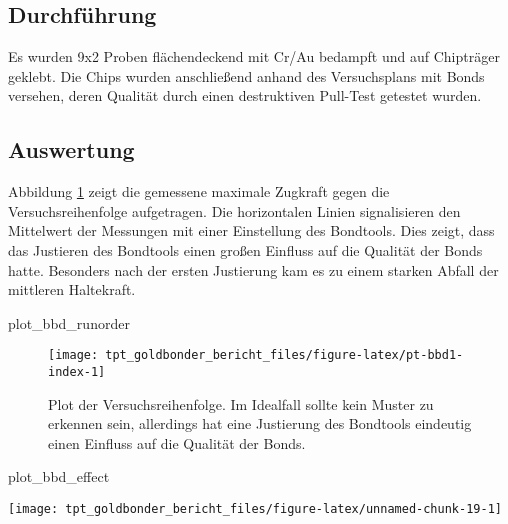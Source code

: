 \documentclass[
  paper=a4,
  ,captions=tableheading
]{scrartcl}
\newenvironment{Shaded}{\begin{snugshade}}{\end{snugshade}}
\newcommand{\NormalTok}[1]{#1}
\begin{document}
\hypertarget{pt-bbd-methods}{%
\subsection{Durchführung}\label{pt-bbd-methods}}

Es wurden 9x2 Proben flächendeckend mit Cr/Au bedampft und auf Chipträger geklebt. Die Chips wurden anschließend anhand des Versuchsplans mit Bonds versehen, deren Qualität durch einen destruktiven Pull-Test getestet wurden.

\hypertarget{auswertung-2}{%
\subsection{Auswertung}\label{auswertung-2}}

Abbildung \ref{fig:pt-bbd1-index} zeigt die gemessene maximale Zugkraft gegen die Versuchsreihenfolge aufgetragen. Die horizontalen Linien signalisieren den Mittelwert der Messungen mit einer Einstellung des Bondtools. Dies zeigt, dass das Justieren des Bondtools einen großen Einfluss auf die Qualität der Bonds hatte. Besonders nach der ersten Justierung kam es zu einem starken Abfall der mittleren Haltekraft.

\begin{Shaded}
\begin{Highlighting}[]
\NormalTok{plot_bbd_runorder}
\end{Highlighting}
\end{Shaded}

\begin{figure}

{\centering \texttt{[image: tpt\_goldbonder\_bericht\_files/figure-latex/pt-bbd1-index-1]} 

}

\caption{Plot der Versuchsreihenfolge. Im Idealfall sollte kein Muster zu erkennen sein, allerdings hat eine Justierung des Bondtools eindeutig einen Einfluss auf die Qualität der Bonds.}\label{fig:pt-bbd1-index}
\end{figure}

\begin{Shaded}
\begin{Highlighting}[]
\NormalTok{plot_bbd_effect}
\end{Highlighting}
\end{Shaded}

\begin{center}\texttt{[image: tpt\_goldbonder\_bericht\_files/figure-latex/unnamed-chunk-19-1]} \end{center}
\end{document}
